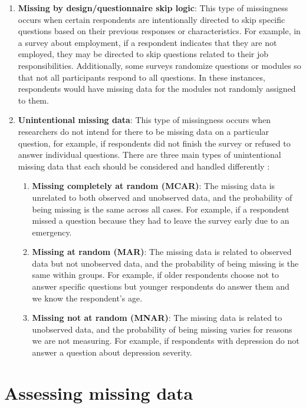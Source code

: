 \documentclass[
]{krantz}
\begin{document}
\begin{enumerate}
\def\labelenumi{\arabic{enumi}.}
\item
  \textbf{Missing by design/questionnaire skip logic}: This type of missingness occurs when certain respondents are intentionally directed to skip specific questions based on their previous responses or characteristics. For example, in a survey about employment, if a respondent indicates that they are not employed, they may be directed to skip questions related to their job responsibilities. Additionally, some surveys randomize questions or modules so that not all participants respond to all questions. In these instances, respondents would have missing data for the modules not randomly assigned to them.
\item
  \textbf{Unintentional missing data}: This type of missingness occurs when researchers do not intend for there to be missing data on a particular question, for example, if respondents did not finish the survey or refused to answer individual questions. There are three main types of unintentional missing data that each should be considered and handled differently \citep{mack, Schafer2002}:

  \begin{enumerate}
  \def\labelenumii{\alph{enumii}.}
  \item
    \textbf{Missing completely at random (MCAR)}: The missing data is unrelated to both observed and unobserved data, and the probability of being missing is the same across all cases. For example, if a respondent missed a question because they had to leave the survey early due to an emergency.
  \item
    \textbf{Missing at random (MAR)}: The missing data is related to observed data but not unobserved data, and the probability of being missing is the same within groups. For example, if older respondents choose not to answer specific questions but younger respondents do answer them and we know the respondent's age.
  \item
    \textbf{Missing not at random (MNAR)}: The missing data is related to unobserved data, and the probability of being missing varies for reasons we are not measuring. For example, if respondents with depression do not answer a question about depression severity.
  \end{enumerate}
\end{enumerate}

\hypertarget{assessing-missing-data}{%
\section{Assessing missing data}\label{assessing-missing-data}}
\end{document}
